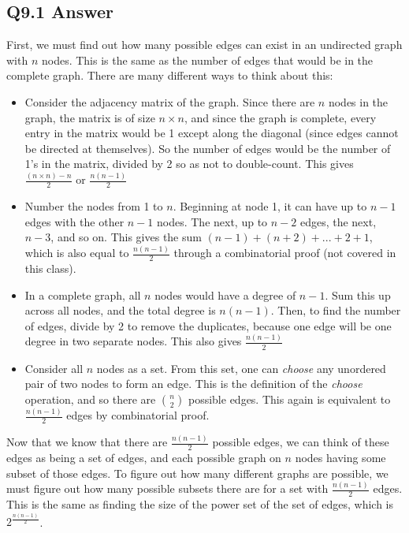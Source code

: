 \documentclass{article}
\begin{document}
\subsection*{Q9.1 Answer}
First, we must find out how many possible edges can exist in an undirected graph with $n$ nodes. This is the same as the number of edges that would be in the complete graph. There are many different ways to think about this:
\begin{itemize}
    \item Consider the adjacency matrix of the graph. Since there are $n$ nodes in the graph, the matrix is of size $n\times n$, and since the graph is complete, every entry in the matrix would be 1 except along the diagonal (since edges cannot be directed at themselves). So the number of edges would be the number of 1's in the matrix, divided by 2 so as not to double-count. This gives $\frac{(n\times n)-n}{2}$ or $\frac{n(n-1)}{2}$
    \item Number the nodes from 1 to $n$. Beginning at node 1, it can have up to $n-1$ edges with the other $n-1$ nodes. The next, up to $n-2$ edges, the next, $n-3$, and so on. This gives the sum $(n-1)+(n+2)+...+2+1$, which is also equal to $\frac{n(n-1)}{2}$ through a combinatorial proof (not covered in this class).
    \item In a complete graph, all $n$ nodes would have a degree of $n-1$. Sum this up across all nodes, and the total degree is $n(n-1)$. Then, to find the number of edges, divide by 2 to remove the duplicates, because one edge will be one degree in two separate nodes. This also gives $\frac{n(n-1)}{2}$
    \item Consider all $n$ nodes as a set. From this set, one can \textit{choose} any unordered pair of two nodes to form an edge. This is the definition of the \textit{choose} operation, and so there are $n\choose 2$ possible edges. This again is equivalent to $\frac{n(n-1)}{2}$ edges by combinatorial proof.
\end{itemize}
Now that we know that there are $\frac{n(n-1)}{2}$ possible edges, we can think of these edges as being a set of edges, and each possible graph on $n$ nodes having some subset of those edges. To figure out how many different graphs are possible, we must figure out how many possible subsets there are for a set with $\frac{n(n-1)}{2}$ edges. This is the same as finding the size of the power set of the set of edges, which is $2^{\frac{n(n-1)}{2}}$.
\newpage
{}
\end{document}
